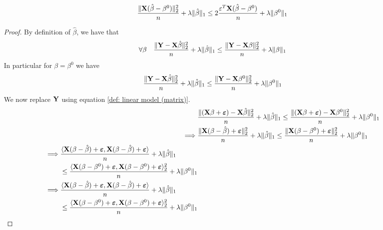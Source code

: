 \begin{lemma}
    $$\frac{\| \mathbf{X} (\hat{\beta}-\beta^{0})\|_{2}^{2}}{n} + \lambda\|\hat{\beta}\|_{1} \leq 2 \frac{\varepsilon^{T} \mathbf{X} (\hat{\beta}-\beta^{0})}{n}+\lambda\|\beta^{0}\|_{1}$$
\end{lemma}
\begin{proof}
    By definition of $\hat \beta$, we have that
    $$
        \forall \beta \quad \frac{\| \mathbf{Y}-\mathbf{X} \hat \beta \|_{2}^{2}}{n} + \lambda \| \hat \beta \|_{1} \leq \frac{\|\mathbf{Y}-\mathbf{X} \beta \|_{2}^{2}}{n}+\lambda \| \beta \|_{1}
    $$
    In particular for $\beta = \beta^0$ we have
    $$
        \frac{\| \mathbf{Y}-\mathbf{X} \hat \beta \|_{2}^{2}}{n}+\lambda\| \hat \beta \|_{1} \leq \frac{ \| \mathbf{Y}-\mathbf{X} \beta^0\|_{2}^{2}}{n}+\lambda \| \beta^0\|_{1}
    $$
    We now replace $\mathbf{Y}$ using equation \eqref{def: linear model (matrix)}.
    \begin{align*}
                 & \frac{\| (\mathbf{X} \beta + \boldsymbol{\varepsilon}) - \mathbf{X} \hat \beta \|_{2}^{2}}{n}+\lambda\| \hat \beta \|_{1} \leq \frac{ \| (\mathbf{X} \beta + \boldsymbol{\varepsilon})-\mathbf{X} \beta^0\|_{2}^{2}}{n}+\lambda \| \beta^0\|_{1} \\
        \implies & \frac{\| \mathbf{X} ( \beta - \hat \beta) + \boldsymbol{\varepsilon} \|_{2}^{2}}{n}+\lambda\| \hat \beta \|_{1} \leq \frac{ \| \mathbf{X} ( \beta - \beta^0) + \boldsymbol{\varepsilon} \|_{2}^{2}}{n}+\lambda \| \beta^0\|_{1}  \\
        \begin{split}
            \implies & \frac{\langle \mathbf{X} ( \beta - \hat \beta) + \boldsymbol{\varepsilon}, \mathbf{X} ( \beta - \hat \beta) + \boldsymbol{\varepsilon} \rangle}{n}+\lambda \| \hat \beta \|_{1} \\
            &\leq \frac{ \langle \mathbf{X} ( \beta - \beta^0) + \boldsymbol{\varepsilon}, \mathbf{X} ( \beta - \beta^0) + \boldsymbol{\varepsilon} \rangle_{2}^{2}}{n}+\lambda \| \beta^0\|_{1} \\
        \end{split}\\
        \begin{split}
            \implies & \frac{\langle \mathbf{X} ( \beta - \hat \beta) + \boldsymbol{\varepsilon}, \mathbf{X} ( \beta - \hat \beta) + \boldsymbol{\varepsilon} \rangle}{n} + \lambda \| \hat \beta \|_{1} \\
            &\leq \frac{ \langle \mathbf{X} ( \beta - \beta^0) + \boldsymbol{\varepsilon}, \mathbf{X} ( \beta - \beta^0) + \boldsymbol{\varepsilon} \rangle_{2}^{2}}{n}+\lambda \| \beta^0\|_{1} \\
        \end{split} \\
    \end{align*}



\end{proof}
